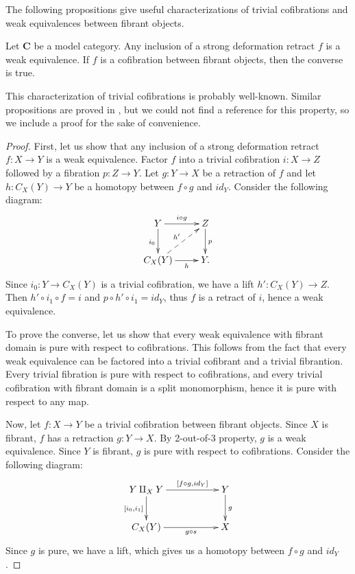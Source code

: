 \documentclass{amsart}
\theoremstyle{definition}
\newcommand{\cat}[1]{\mathbf{#1}}
\newcommand{\C}{\cat{C}}
\newcommand{\cyli}{i}
\begin{document}
The following propositions give useful characterizations of trivial
cofibrations and weak equivalences between fibrant objects.

\begin{prop}
Let $\C$ be a model category.
Any inclusion of a strong deformation retract $f$ is a weak equivalence.
If $f$ is a cofibration between fibrant objects, then the converse is true.
\end{prop}

This characterization of trivial cofibrations is probably well-known.
Similar propositions are proved in \cite{hirschhorn}, but we could not find a reference for this property, so we include a proof for the sake of convenience.

\begin{proof}
First, let us show that any inclusion of a strong deformation retract $f : X \to Y$ is a weak equivalence.
Factor $f$ into a trivial cofibration $i : X \to Z$ followed by a fibration $p : Z \to Y$.
Let $g : Y \to X$ be a retraction of $f$ and let $h : C_X(Y) \to Y$ be a homotopy between $f \circ g$ and $id_Y$.
Consider the following diagram:
\[ \xymatrix{ Y \ar[r]^{i \circ g} \ar[d]_{\cyli_0} & Z \ar[d]^p \\
              C_X(Y) \ar[r]_-h \ar@{-->}[ur]^{h'}   & Y.
            } \]
Since $\cyli_0 : Y \to C_X(Y)$ is a trivial cofibration, we have a lift $h' : C_X(Y) \to Z$.
Then $h' \circ \cyli_1 \circ f = i$ and $p \circ h' \circ \cyli_1 = id_Y$, thus $f$ is a retract of $i$, hence a weak equivalence.

To prove the converse, let us show that every weak equivalence with fibrant domain is pure with respect to cofibrations.
This follows from the fact that every weak equivalence can be factored into a trivial cofibrant and a trivial fibrantion.
Every trivial fibration is pure with respect to cofibrations, and every trivial cofibration with fibrant domain is a split monomorphism,
hence it is pure with respect to any map.

Now, let $f : X \to Y$ be a trivial cofibration between fibrant objects.
Since $X$ is fibrant, $f$ has a retraction $g : Y \to X$.
By 2-out-of-3 property, $g$ is a weak equivalence.
Since $Y$ is fibrant, $g$ is pure with respect to cofibrations.
Consider the following diagram:
\[ \xymatrix{ Y \amalg_X Y \ar[rr]^-{[f \circ g, id_Y]} \ar[d]_{[\cyli_0,\cyli_1]} & & Y \ar[d]^g \\
              C_X(Y) \ar[rr]_-{g \circ s} & & X
            } \]
Since $g$ is pure, we have a lift, which gives us a homotopy between $f \circ g$ and $id_Y$.
\end{proof}
\end{document}
